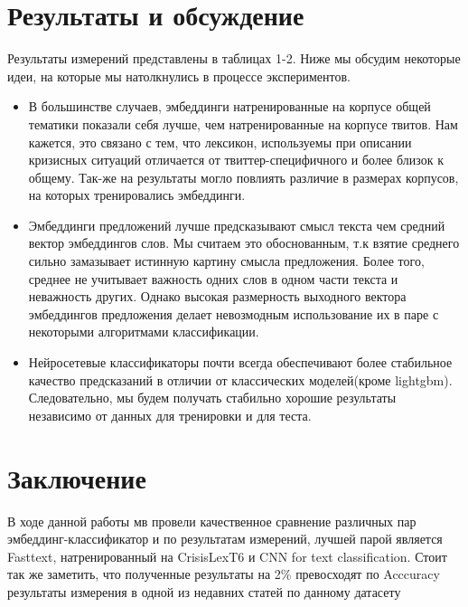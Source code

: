 
\section{Результаты и обсуждение}
Результаты измерений представлены в таблицах 1-2. Ниже мы обсудим некоторые идеи, на которые мы натолкнулись в процессе экспериментов.
\begin{itemize}
\item В большинстве случаев, эмбеддинги натренированные на корпусе общей тематики показали себя лучше, чем натренированные на корпусе твитов. Нам кажется, это связано с тем, что лексикон, используемы при описании кризисных ситуаций отличается от твиттер-специфичного и более близок к общему. Так-же на результаты могло повлиять различие в размерах корпусов, на которых тренировались эмбеддинги.
\item Эмбеддинги предложений лучше предсказывают смысл текста чем средний вектор эмбеддингов слов. Мы считаем это обоснованным, т.к взятие среднего сильно замазывает истинную картину смысла предложения. Более того, среднее не учитывает важность одних слов в одном части текста и неважность других. Однако высокая размерность выходного вектора эмбеддингов предложения делает невозмодным использование их в паре с некоторыми алгоритмами классификации.
\item Нейросетевые классификаторы почти всегда обеспечивают более стабильное качество предсказаний в отличии от классических моделей(кроме lightgbm). Следовательно, мы будем получать стабильно хорошие результаты независимо от данных для тренировки и для теста.
\end{itemize}

\section{Заключение}
В ходе данной работы мв провели качественное сравнение различных пар эмбеддинг-классификатор и по результатам измерений, лучшей парой является Fasttext, натренированный на CrisisLexT6 и CNN for text classification. Стоит так же заметить, что полученные результаты на 2\% превосходят по Acccuracy результаты измерения в одной из недавних статей по данному датасету \cite{domain}

